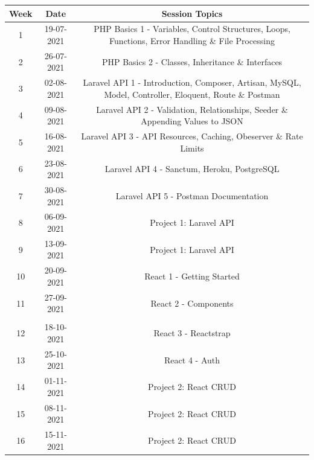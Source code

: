 \documentclass{article}
\begin{document}
\renewcommand{\arraystretch}{1.5}
\begin{tabular}{|c|c|c|c|}
	\hline
	\textbf{Week} & \textbf{Date}     & \multicolumn{2}{c|}{\textbf{Session Topics}}        \\ \hline
	\footnotesize 1      & \footnotesize 19-07-2021 & \multicolumn{2}{c|}{\footnotesize PHP Basics 1 - Variables, Control Structures, Loops, Functions, Error Handling \& File Processing} \\ \hline
	\footnotesize 2      & \footnotesize 26-07-2021 & \multicolumn{2}{c|}{\footnotesize PHP Basics 2 - Classes, Inheritance \& Interfaces} \\ \hline
	\footnotesize 3      & \footnotesize 02-08-2021 & \multicolumn{2}{c|}{\footnotesize Laravel API 1 - Introduction, Composer, Artisan, MySQL, Model, Controller, Eloquent, Route \& Postman} \\ \hline
	\footnotesize 4      & \footnotesize 09-08-2021 & \multicolumn{2}{c|}{\footnotesize Laravel API 2 - Validation, Relationships, Seeder \& Appending Values to JSON} \\ \hline
	\footnotesize 5      & \footnotesize 16-08-2021 & \multicolumn{2}{c|}{\footnotesize Laravel API 3 - API Resources, Caching, Obeserver \& Rate Limits} \\ \hline
	\footnotesize 6      & \footnotesize 23-08-2021 & \multicolumn{2}{c|}{\footnotesize Laravel API 4 - Sanctum, Heroku, PostgreSQL} \\ \hline
	\footnotesize 7      & \footnotesize 30-08-2021 & \multicolumn{2}{c|}{\footnotesize Laravel API 5 - Postman Documentation} \\ \hline
	\footnotesize 8      & \footnotesize 06-09-2021 & \multicolumn{2}{c|}{\footnotesize Project 1: Laravel API} \\ \hline
	\footnotesize 9      & \footnotesize 13-09-2021 & \multicolumn{2}{c|}{\footnotesize Project 1: Laravel API} \\ \hline

	\footnotesize 10      & \footnotesize 20-09-2021 & \multicolumn{2}{c|}{\footnotesize React 1 - Getting Started} \\ \hline
	\footnotesize 11     & \footnotesize 27-09-2021 & \multicolumn{2}{c|}{\footnotesize React 2 - Components} \\ \hline
	\rowcolor{yellow} \multicolumn{4}{|c|}{\footnotesize Mid Term Break}                    \\ \hline
	\footnotesize 12     & \footnotesize 18-10-2021 & \multicolumn{2}{c|}{\footnotesize React 3 - Reactstrap}     \\ \hline
	\footnotesize 13     & \footnotesize 25-10-2021 & \multicolumn{2}{c|}{\footnotesize React 4 - Auth}    \\ \hline
	\footnotesize 14     & \footnotesize 01-11-2021 & \multicolumn{2}{c|}{\footnotesize Project 2: React CRUD}     \\ \hline
	\footnotesize 15     & \footnotesize 08-11-2021 & \multicolumn{2}{c|}{\footnotesize Project 2: React CRUD}     \\ \hline
	\footnotesize 16     & \footnotesize 15-11-2021 & \multicolumn{2}{c|}{\footnotesize Project 2: React CRUD}     \\ \hline
\end{tabular}
\end{document}
